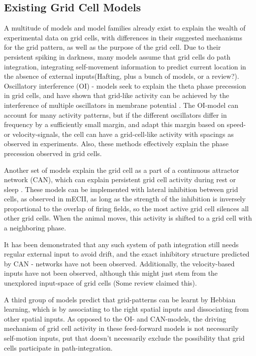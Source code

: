 \documentclass{article}
\begin{document}
    \subsection{Existing Grid Cell Models}
    A multitude of models and model families already exist to explain the wealth of experimental data on grid cells, with differences in their suggested mechanisms for the grid pattern, as well as the purpose of the grid cell. Due to their persistent spiking in darkness, many models assume that grid cells do path integration, integrating self-movement information to predict current location in the absence of external inputs(Hafting, plus a bunch of models, or a review?). Oscillatory interference (OI) - models seek to explain the theta phase precession in grid cells, and have shown that grid-like activity can be achieved by the interference of multiple oscillators in membrane potential \parencite{Burgess2007,Zilli2010}. The OI-model can account for many activity patterns, but if the different oscillators differ in frequency by a sufficiently small margin, and adapt this margin based on speed- or velocity-signals, the cell can have a grid-cell-like activity with spacings as observed in experiments. Also, these methods effectively explain the phase precession observed in grid cells. 

    Another set of models explain the grid cell as a part of a continuous attractor network (CAN), which can explain persistent grid cell activity during rest or sleep \parencite{Yoon2013,Widloski2014}. These models can be implemented with lateral inhibition between grid cells, as observed in mECII, as long as the strength of the inhibition is inversely proportional to the overlap of firing fields, so the most active grid cell silences all other grid cells. When the animal moves, this activity is shifted to a grid cell with a neighboring phase.

    It has been demonstrated that any such system of path integration still needs regular external input to avoid drift, and the exact inhibitory structure predicted by CAN - networks have not been observed. Additionally, the velocity-based inputs have not been observed, although this might just stem from the unexplored input-space of grid cells (Some review claimed this).

    A third group of models predict that grid-patterns can be learnt by Hebbian learning, which is by associating to the right spatial inputs and dissociating from other spatial inputs. As opposed to the OI- and CAN-models, the driving mechanism of grid cell activity in these feed-forward models is not necessarily self-motion inputs, put that doesn't necessarily exclude the possibility that grid cells participate in path-integration. 
    
\end{document}
